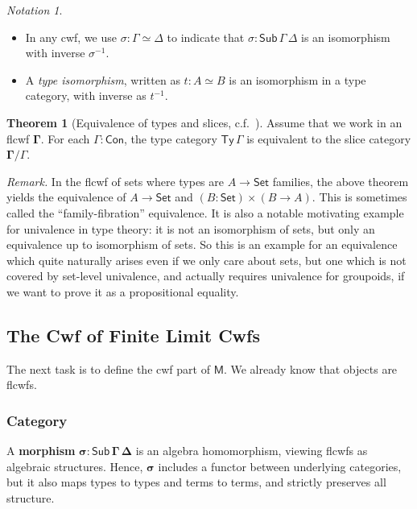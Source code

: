 \documentclass[12pt,a4paper,twoside,openany]{book}
\theoremstyle{remark}
\newtheorem{notation}{Notation}
\theoremstyle{definition}
\theoremstyle{theorem}
\newtheorem{theorem}{Theorem}
\newcommand{\bs}[1]{\boldsymbol{#1}}
\newcommand{\Con}{\mathsf{Con}}
\newcommand{\Sub}{\mathsf{Sub}}
\newcommand{\Ty}{\mathsf{Ty}}
\newcommand{\Set}{\mathsf{Set}}
\newcommand{\bSub}{\bs{\Sub}}
\newcommand{\bGamma}{\bs{\Gamma}}
\newcommand{\bDelta}{\bs{\Delta}}
\newcommand{\bsigma}{\bs{\sigma}}
\newcommand{\bM}{\bs{\mathsf{M}}}
\begin{document}
\begin{notation}
  ~\\
  \begin{itemize}
  \item  \vspace{-1.7em}
         In any cwf, we use $\sigma : \Gamma \simeq \Delta$ to indicate
         that $\sigma : \Sub\,\Gamma\,\Delta$ is an isomorphism with inverse $\sigma^{-1}$.
    \item A \emph{type isomorphism}, written as $t : A \simeq B$ is an isomorphism in a
         type category, with inverse as $t^{-1}$.
  \end{itemize}
\end{notation}

\begin{theorem}[Equivalence of types and slices, c.f.\ {\cite[Section 2.2]{clairambault2014biequivalence}}]\label{thm:ty-slice}
Assume that we work in an flcwf $\bGamma$. For each $\Gamma : \Con$, the type
category $\Ty\,\Gamma$ is equivalent to the slice category $\bGamma/\Gamma$.
\end{theorem}

\emph{Remark.} In the flcwf of sets where types are $A \to \Set$ families, the
above theorem yields the equivalence of $A \to \Set$ and $(B : \Set) \times (B
\to A)$. This is sometimes called the ``family-fibration'' equivalence. It is
also a notable motivating example for univalence in type theory: it is not an
isomorphism of sets, but only an equivalence up to isomorphism of sets. So this
is an example for an equivalence which quite naturally arises even if we only
care about sets, but one which is not covered by set-level univalence, and
actually requires univalence for groupoids, if we want to prove it as a
propositional equality.

\subsection{The Cwf of Finite Limit Cwfs}

The next task is to define the cwf part of $\bM$. We already know that objects
are flcwfs.

\subsubsection{Category}

A \textbf{morphism} $\bsigma : \bSub\,\bGamma\,\bDelta$ is an algebra
homomorphism, viewing flcwfs as algebraic structures. Hence, $\bsigma$ includes
a functor between underlying categories, but it also maps types to types and
terms to terms, and strictly preserves all structure.
\end{document}
